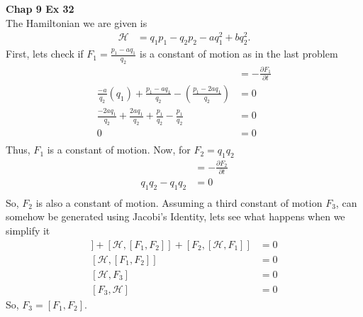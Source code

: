 \documentclass[10pt]{article}
\begin{document}
\textbf{Chap 9 Ex 32}\\
The Hamiltonian we are given is
\begin{align*}
  \mathcal{H} &= q_1p_1-q_2p_2-aq_1^2+bq_2^2.
\end{align*}
First, lets check if $F_1=\frac{p_1-aq_1}{q_2}$ is a constant of motion as in
the last problem
\begin{align*}
  [F_1,\mathcal{H}] &= -\frac{\partial F_1}{\partial t}\\
  \frac{-a}{q_2}(q_1) + \frac{p_1-aq_1}{q_2} - \left( \frac{p_1-2aq_1}{q_2} \right) &= 0\\
  \frac{-2aq_1}{q_2} + \frac{2aq_1}{q_2} + \frac{p_1}{q_2} - \frac{p_1}{q_2}  &= 0\\
  0 &= 0\\
\end{align*}
Thus, $F_1$ is a constant of motion.  Now, for $F_2=q_1q_2$
\begin{align*}
  [F_2,\mathcal{H}] &= -\frac{\partial F_2}{\partial t}\\
  q_1q_2 - q_1q_2 &= 0\\
\end{align*}
So, $F_2$ is also a constant of motion.  Assuming a third constant of motion $F_3$, can 
somehow be generated using Jacobi's Identity, lets see what happens when we simplify it
\begin{align*}
  [F_1,[F_2,\mathcal{H}]] + [\mathcal{H},[F_1,F_2]] + [F_2,[\mathcal{H},F_1]] &= 0\\
   [\mathcal{H},[F_1,F_2]]  &= 0\\
   [\mathcal{H},F_3]  &= 0\\
   [F_3,\mathcal{H}]  &= 0
\end{align*}
So, $F_3=[F_1,F_2]$.
\end{document}
